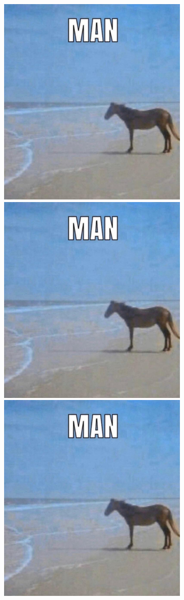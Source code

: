 \documentclass[12pt, fleqn, titlepage]{article}
\newcommand\skipper{1.4pt}
\begin{document}
\begin{figure}[H]
\begin{subfigure}[b]{0.8\textwidth}
		\hskip\skipper
		\includegraphics[width=0.18\linewidth]{imgs/temp_horse}
		\hskip\skipper
		\includegraphics[width=0.18\linewidth]{imgs/temp_horse}
		\hskip\skipper
		\includegraphics[width=0.18\linewidth]{imgs/temp_horse}
	\end{subfigure}
\end{figure}
\end{document}
